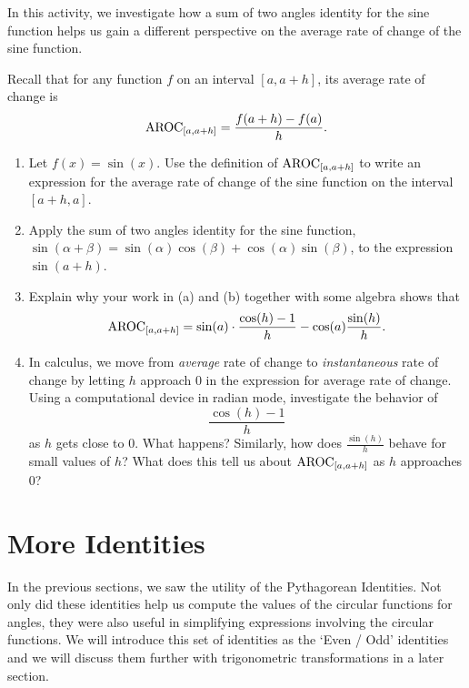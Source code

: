 \documentclass{ximera}
\begin{document}
\begin{exploration}
In this activity, we investigate how a sum of two angles identity for the sine function helps us gain a different perspective on the average rate of change of the sine function.%

Recall that for any function \(f\) on an interval \([a,a+h]\), its average rate of change is%
\[
\mathrm{AROC}_{[a,a+h]} = \frac{f(a+h)-f(a)}{h}\text{.}
\]

\begin{enumerate}[label=\alph*.]
\item
Let \(f(x) = \sin(x)\).  Use the definition of \(\mathrm{AROC}_{[a,a+h]}\) to write an expression for the average rate of change of the sine function on the interval \([a+h,a]\).%
\item
Apply the sum of two angles identity for the sine function, \(\sin(\alpha + \beta) = \sin(\alpha) \cos(\beta) + \cos(\alpha) \sin(\beta)\), to the expression \(\sin(a+h)\).%
\item
Explain why your work in (a) and (b) together with some algebra shows that%
\[
\mathrm{AROC}_{[a,a+h]} = \sin(a) \cdot \frac{\cos(h)-1}{h} - \cos(a) \frac{\sin(h)}{h}\text{.}
\]
%
\item
In calculus, we move from \emph{average} rate of change to \emph{instantaneous} rate of change by letting \(h\) approach \(0\) in the expression for average rate of change.  Using a computational device in radian mode, investigate the behavior of%
\[
\frac{\cos(h)-1}{h}
\]
as \(h\) gets close to \(0\).  What happens?  Similarly, how does \(\frac{\sin(h)}{h}\) behave for small values of \(h\)?  What does this tell us about \(\mathrm{AROC}_{[a,a+h]}\) as \(h\) approaches \(0\)?%
\end{enumerate}
\end{exploration}


\section{More Identities}
In the previous sections, we saw the utility of the Pythagorean Identities.  Not only did these identities help us compute the values of the circular functions for angles, they were also useful in simplifying expressions involving the circular functions. We will introduce this set of identities as the `Even / Odd' identities and we will discuss them further with trigonometric transformations in a later section.
\end{document}

